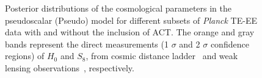 \documentclass[a4paper,11pt]{article}
\begin{document}
 \begin{figure}[h!]
 \centering
 \caption{Posterior distributions of the cosmological parameters in the pseudoscalar (Pseudo) model for different subsets of \emph{Planck} TE-EE data with and without the inclusion of ACT. The orange and gray bands represent the direct measurements (1 $\sigma$ and 2 $\sigma$ confidence regions) of $H_0$ and $S_8$, from cosmic distance ladder~\cite{Riess:2020fzl} and weak lensing observations~\cite{Gatti:2021uwl}, respectively.
 }

\label{fig:Planckcut}
\end{figure}
\end{document}
